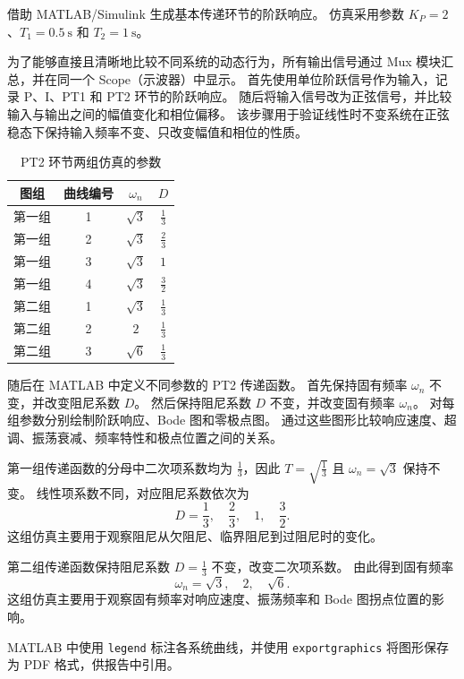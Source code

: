 借助 MATLAB/Simulink 生成基本传递环节的阶跃响应。
仿真采用参数 $K_P = 2$、$T_1 = \SI{0.5}{\second}$ 和 $T_2 = \SI{1}{\second}$。

为了能够直接且清晰地比较不同系统的动态行为，所有输出信号通过 Mux 模块汇总，并在同一个 Scope（示波器）中显示。
首先使用单位阶跃信号作为输入，记录 P、I、PT1 和 PT2 环节的阶跃响应。
随后将输入信号改为正弦信号，并比较输入与输出之间的幅值变化和相位偏移。
该步骤用于验证线性时不变系统在正弦稳态下保持输入频率不变、只改变幅值和相位的性质。

\begin{table}[htbp]
  \centering
  \caption{PT2 环节两组仿真的参数}
  \begin{tabular}{cccc}
    \toprule
    图组  & 曲线编号 & $\omega_n$ & $D$           \\
    \midrule
    第一组 & 1    & $\sqrt{3}$ & $\frac{1}{3}$ \\
    第一组 & 2    & $\sqrt{3}$ & $\frac{2}{3}$ \\
    第一组 & 3    & $\sqrt{3}$ & $1$           \\
    第一组 & 4    & $\sqrt{3}$ & $\frac{3}{2}$ \\
    第二组 & 1    & $\sqrt{3}$ & $\frac{1}{3}$ \\
    第二组 & 2    & $2$        & $\frac{1}{3}$ \\
    第二组 & 3    & $\sqrt{6}$ & $\frac{1}{3}$ \\
    \bottomrule
  \end{tabular}
\end{table}

随后在 MATLAB 中定义不同参数的 PT2 传递函数。
首先保持固有频率 $\omega_n$ 不变，并改变阻尼系数 $D$。
然后保持阻尼系数 $D$ 不变，并改变固有频率 $\omega_n$。
对每组参数分别绘制阶跃响应、Bode 图和零极点图。
通过这些图形比较响应速度、超调、振荡衰减、频率特性和极点位置之间的关系。

第一组传递函数的分母中二次项系数均为 $\frac{1}{3}$，因此 $T=\sqrt{\frac{1}{3}}$ 且 $\omega_n=\sqrt{3}$ 保持不变。
线性项系数不同，对应阻尼系数依次为
\[
  D = \frac{1}{3},\quad \frac{2}{3},\quad 1,\quad \frac{3}{2}.
\]
这组仿真主要用于观察阻尼从欠阻尼、临界阻尼到过阻尼时的变化。

第二组传递函数保持阻尼系数 $D=\frac{1}{3}$ 不变，改变二次项系数。
由此得到固有频率
\[
  \omega_n = \sqrt{3},\quad 2,\quad \sqrt{6}.
\]
这组仿真主要用于观察固有频率对响应速度、振荡频率和 Bode 图拐点位置的影响。

MATLAB 中使用 \texttt{legend} 标注各系统曲线，并使用 \texttt{exportgraphics} 将图形保存为 PDF 格式，供报告中引用。
